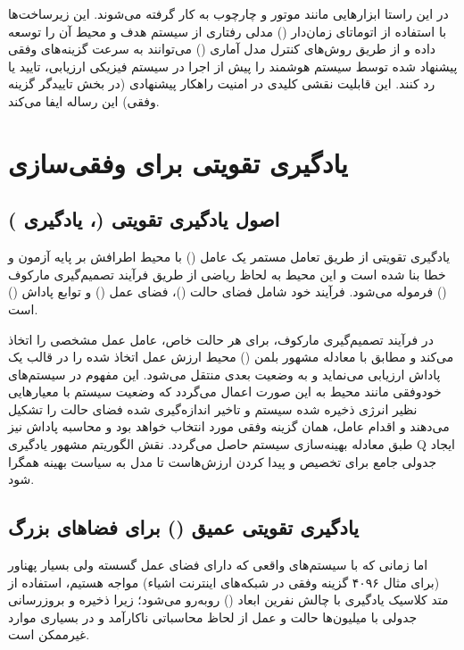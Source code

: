 \documentclass[oneside,openany,phd]{TMU-Thesis}
\begin{document}
در این راستا ابزارهایی مانند موتور  و چارچوب  به کار گرفته می‌شوند. این زیرساخت‌ها با استفاده از اتوماتای زمان‌دار () مدلی رفتاری از سیستم هدف و محیط آن را توسعه داده و از طریق روش‌های کنترل مدل آماری () می‌توانند به سرعت گزینه‌های وفقی پیشنهاد شده توسط سیستم هوشمند را پیش از اجرا در سیستم فیزیکی ارزیابی، تایید یا رد کنند. این قابلیت نقشی کلیدی در امنیت راهکار پیشنهادی (در بخش تاییدگر گزینه وفقی) این رساله ایفا می‌کند.

\section{یادگیری تقویتی برای وفقی‌سازی}
\subsection{اصول یادگیری تقویتی (، یادگیری )}

یادگیری تقویتی از طریق تعامل مستمر یک عامل () با محیط اطرافش بر پایه آزمون و خطا بنا شده است و این محیط به لحاظ ریاضی از طریق فرآیند تصمیم‌گیری مارکوف () فرموله می‌شود. فرآیند  خود شامل فضای حالت ()، فضای عمل () و توابع پاداش () است.

در فرآیند تصمیم‌گیری مارکوف، برای هر حالت خاص، عامل عمل مشخصی را اتخاذ می‌کند و مطابق با معادله مشهور بلمن () محیط ارزش عمل اتخاذ شده را در قالب یک پاداش ارزیابی می‌نماید و به وضعیت بعدی منتقل می‌شود. این مفهوم در سیستم‌های خودوفقی مانند محیط  به این صورت اعمال می‌گردد که وضعیت سیستم با معیارهایی نظیر انرژی ذخیره شده سیستم و تاخیر اندازه‌گیری شده فضای حالت را تشکیل می‌دهند و اقدام عامل، همان گزینه وفقی مورد انتخاب خواهد بود و محاسبه پاداش نیز طبق معادله بهینه‌سازی سیستم حاصل می‌گردد. نقش الگوریتم مشهور یادگیری Q ایجاد جدولی جامع برای تخصیص و پیدا کردن ارزش‌هاست تا مدل به سیاست بهینه همگرا شود.

\subsection{یادگیری تقویتی عمیق () برای فضاهای بزرگ}

اما زمانی که با سیستم‌های واقعی که دارای فضای عمل گسسته ولی بسیار پهناور (برای مثال ۴۰۹۶ گزینه وفقی در شبکه‌های اینترنت اشیاء) مواجه هستیم، استفاده از متد کلاسیک یادگیری  با چالش نفرین ابعاد () روبه‌رو می‌شود؛ زیرا ذخیره و بروزرسانی جدولی با میلیون‌ها حالت و عمل از لحاظ محاسباتی ناکارآمد و در بسیاری موارد غیرممکن است.
\end{document}
